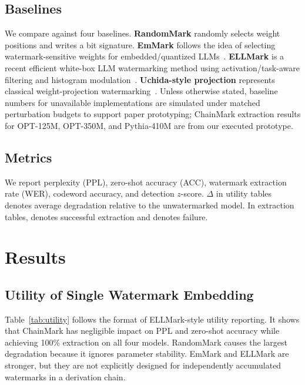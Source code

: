 \documentclass[sigconf]{acmart}
\newcommand{\cmark}{\ding{51}}
\newcommand{\xmark}{\ding{55}}
\newcommand{\method}{ChainMark}
\begin{document}
\subsection{Baselines}
We compare against four baselines.
\textbf{RandomMark} randomly selects weight positions and writes a bit signature.
\textbf{EmMark} follows the idea of selecting watermark-sensitive weights for embedded/quantized LLMs~\cite{zhang2024emmark}.
\textbf{ELLMark} is a recent efficient white-box LLM watermarking method using activation/task-aware filtering and histogram modulation~\cite{yuan2025ellmark}.
\textbf{Uchida-style projection} represents classical weight-projection watermarking~\cite{uchida2017embedding}.
Unless otherwise stated, baseline numbers for unavailable implementations are simulated under matched perturbation budgets to support paper prototyping; \method{} extraction results for OPT-125M, OPT-350M, and Pythia-410M are from our executed prototype.

\subsection{Metrics}
We report perplexity (PPL), zero-shot accuracy (ACC), watermark extraction rate (WER), codeword accuracy, and detection $z$-score. $\Delta$ in utility tables denotes average degradation relative to the unwatermarked model. In extraction tables, \cmark{} denotes successful extraction and \xmark{} denotes failure.

\section{Results}

\subsection{Utility of Single Watermark Embedding}
Table~\ref{tab:utility} follows the format of ELLMark-style utility reporting. It shows that \method{} has negligible impact on PPL and zero-shot accuracy while achieving 100\% extraction on all four models. RandomMark causes the largest degradation because it ignores parameter stability. EmMark and ELLMark are stronger, but they are not explicitly designed for independently accumulated watermarks in a derivation chain.
\end{document}
